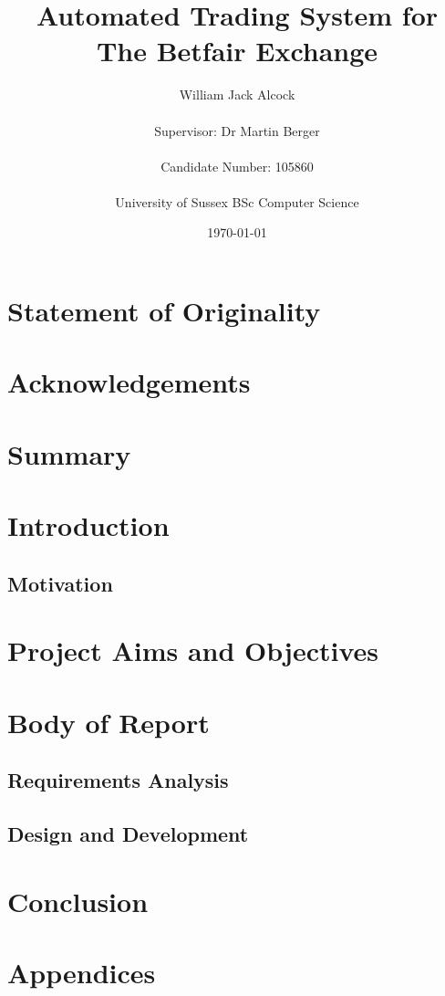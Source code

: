 \documentclass[11pt]{report}
\begin{document}
\title{Automated Trading System for The Betfair Exchange}
\author{William Jack Alcock\\\\Supervisor: Dr Martin Berger\\\\Candidate Number: 105860\\\\University of Sussex BSc Computer Science}
\date{\today}

\maketitle

\chapter{Statement of Originality}

\chapter{Acknowledgements}

\chapter{Summary}

\tableofcontents

\chapter{Introduction}
	\section{Motivation}
	


\chapter{Project Aims and Objectives}

\chapter{Body of Report}
	\section{Requirements Analysis}
	\section{Design and Development}
\chapter{Conclusion}

\chapter{Appendices}

\printbibliography[heading=bibintoc]
\end{document}
